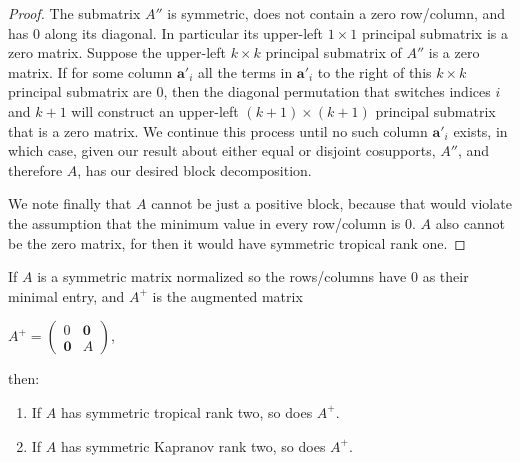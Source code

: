\documentclass{article}
\begin{document}
\begin{proof}
  The submatrix $A''$ is symmetric, does not contain a zero row/column, and has $0$ along its diagonal. In particular its upper-left $1 \times 1$ principal submatrix is a zero matrix. Suppose the upper-left $k \times k$ principal submatrix of $A''$ is a zero matrix. If for some column $\textbf{a}'_{i}$ all the terms in $\textbf{a}'_{i}$ to the right of this $k \times k$ principal submatrix are $0$, then the diagonal permutation that switches indices $i$ and $k+1$ will construct an upper-left $(k+1) \times (k+1)$ principal submatrix that is a zero matrix. We continue this process until no such column $\textbf{a}'_{i}$ exists, in which case, given our result about either equal or disjoint cosupports, $A''$, and therefore $A$, has our desired block decomposition. 
  
  We note finally that $A$ cannot be just a positive block, because that would violate the assumption that the minimum value in every row/column is $0$. $A$ also cannot be the zero matrix, for then it would have symmetric tropical rank one.
\end{proof}

\begin{lem}
  If $A$ is a symmetric matrix normalized so the rows/columns have $0$ as their minimal entry, and $A^{+}$ is the augmented matrix
  
  \begin{center}
    
    $A^{+} = \left(\begin{array}{cc} 0 & \textbf{0} \\ \textbf{0} & A \end{array}\right)$,
    
  \end{center}
  
  then:
  
  \begin{enumerate}
    
  \item If $A$ has symmetric tropical rank two, so does $A^{+}$.
    
  \item If $A$ has symmetric Kapranov rank two, so does $A^{+}$.
    
  \end{enumerate}
\end{lem}
\end{document}
